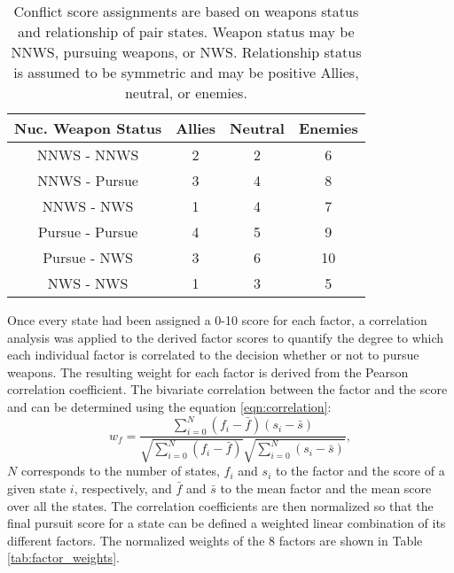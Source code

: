 \begin{table}
\centering
\begin{tabular}{||c|c|c|c|}
\hline
\textbf{Nuc. Weapon Status} & \textbf{Allies}  & \textbf{Neutral}  & \textbf{Enemies} \\
\hline
\hline
NNWS - NNWS     & 2 & 2 & 6 \\
\hline
NNWS - Pursue   & 3 & 4 & 8 \\
\hline
NNWS - NWS      & 1 & 4 & 7 \\
\hline
Pursue - Pursue & 4 & 5 & 9 \\
\hline
Pursue - NWS    & 3 & 6 & 10 \\
\hline
NWS - NWS       & 1 & 3 & 5 \\
\hline
\end{tabular}
\caption{Conflict score assignments are based on weapons status and relationship of pair states. Weapon status may be \gls{NNWS}, pursuing weapons, or \gls{NWS}. Relationship status is assumed to be symmetric and  may be positive Allies, neutral, or enemies.}
\label{tab:conflict}
\end{table}

Once every state had been assigned a 0-10 score for each factor, a correlation
analysis was applied to the derived factor scores to quantify the degree to
which each individual factor is correlated to the decision whether or not to
pursue weapons. The resulting weight for each factor is derived from the Pearson correlation coefficient. The bivariate correlation between the factor and the score and can be determined using the equation \ref{eqn:correlation}:
\begin{equation}
    \label{eqn:correlation}
    w_{f} = \frac{\sum_{i=0}^{N} (f_{i} - \bar{f}) (s_{i} - \bar{s})}
                 {\sqrt{\sum_{i=0}^{N}\left(f_{i} - \bar{f}\right)}
                 \sqrt{\sum_{i=0}^{N}\left(s_{i} - \bar{s}\right)}},
\end{equation}
$N$ corresponds to the number of states, $f_{i}$ and $s_{i}$ to the factor and the score of a given state $i$, respectively,  and $\bar{f}$ and $\bar{s}$ to
the mean factor and the mean score over all the states.  The correlation coefficients are then normalized so that the final pursuit score for a state can be defined a weighted linear combination of its different factors. The normalized weights of the 8 factors are shown in Table \ref{tab:factor_weights}. 

